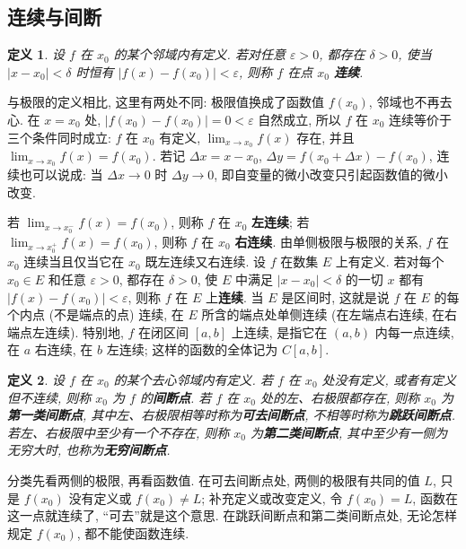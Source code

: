 \documentclass[UTF8,openany]{ctexbook}
\theoremstyle{chinesetextbook}
\newtheorem{definition}{定义}[section]
\begin{document}
\subsection{连续与间断}
\begin{definition}
设 $f$ 在 $x_0$ 的某个邻域内有定义. 若对任意 $\varepsilon>0$, 都存在 $\delta>0$, 使当 $|x-x_0|<\delta$ 时恒有 $|f(x)-f(x_0)|<\varepsilon$, 则称 $f$ 在点 $x_0$ \textbf{连续}.
\end{definition}
与极限的定义相比, 这里有两处不同: 极限值换成了函数值 $f(x_0)$, 邻域也不再去心. 在 $x=x_0$ 处, $|f(x_0)-f(x_0)|=0<\varepsilon$ 自然成立, 所以 $f$ 在 $x_0$ 连续等价于三个条件同时成立: $f$ 在 $x_0$ 有定义, $\displaystyle\lim_{x\to x_0}f(x)$ 存在, 并且 $\displaystyle\lim_{x\to x_0}f(x)=f(x_0)$. 若记 $\Delta x=x-x_0$, $\Delta y=f(x_0+\Delta x)-f(x_0)$, 连续也可以说成: 当 $\Delta x\to0$ 时 $\Delta y\to0$, 即自变量的微小改变只引起函数值的微小改变.

若 $\displaystyle\lim_{x\to x_0^-}f(x)=f(x_0)$, 则称 $f$ 在 $x_0$ \textbf{左连续}; 若 $\displaystyle\lim_{x\to x_0^+}f(x)=f(x_0)$, 则称 $f$ 在 $x_0$ \textbf{右连续}. 由单侧极限与极限的关系, $f$ 在 $x_0$ 连续当且仅当它在 $x_0$ 既左连续又右连续. 设 $f$ 在数集 $E$ 上有定义. 若对每个 $x_0\in E$ 和任意 $\varepsilon>0$, 都存在 $\delta>0$, 使 $E$ 中满足 $|x-x_0|<\delta$ 的一切 $x$ 都有 $|f(x)-f(x_0)|<\varepsilon$, 则称 $f$ 在 $E$ 上\textbf{连续}. 当 $E$ 是区间时, 这就是说 $f$ 在 $E$ 的每个内点 (不是端点的点) 连续, 在 $E$ 所含的端点处单侧连续 (在左端点右连续, 在右端点左连续). 特别地, $f$ 在闭区间 $[a,b]$ 上连续, 是指它在 $(a,b)$ 内每一点连续, 在 $a$ 右连续, 在 $b$ 左连续; 这样的函数的全体记为 $C[a,b]$.
\begin{definition}
设 $f$ 在 $x_0$ 的某个去心邻域内有定义. 若 $f$ 在 $x_0$ 处没有定义, 或者有定义但不连续, 则称 $x_0$ 为 $f$ 的\textbf{间断点}. 若 $f$ 在 $x_0$ 处的左、右极限都存在, 则称 $x_0$ 为\textbf{第一类间断点}, 其中左、右极限相等时称为\textbf{可去间断点}, 不相等时称为\textbf{跳跃间断点}. 若左、右极限中至少有一个不存在, 则称 $x_0$ 为\textbf{第二类间断点}, 其中至少有一侧为无穷大时, 也称为\textbf{无穷间断点}.
\end{definition}
分类先看两侧的极限, 再看函数值. 在可去间断点处, 两侧的极限有共同的值 $L$, 只是 $f(x_0)$ 没有定义或 $f(x_0)\ne L$; 补充定义或改变定义, 令 $f(x_0)=L$, 函数在这一点就连续了, “可去”就是这个意思. 在跳跃间断点和第二类间断点处, 无论怎样规定 $f(x_0)$, 都不能使函数连续.
\end{document}
